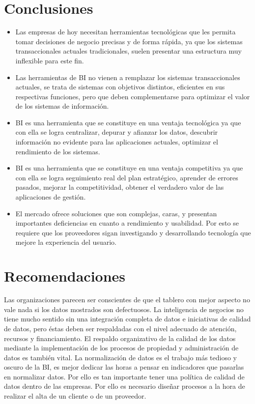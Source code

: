 \documentclass[twoside,twocolumn]{article}
\begin{document}
\section{Conclusiones}
\begin{itemize}	
	\item Las empresas de hoy necesitan herramientas tecnológicas que les permita tomar decisiones de negocio precisas y de forma rápida, ya que los sistemas transaccionales actuales tradicionales, suelen presentar una estructura muy inflexible para este fin.
	\item Las herramientas de BI no vienen a remplazar los sistemas transaccionales actuales, se trata de sistemas con objetivos distintos, eficientes en sus respectivas funciones, pero que deben complementarse para optimizar el valor de los sistemas de información.
	\item BI es una herramienta que se constituye en una ventaja tecnológica ya que con ella se logra centralizar, depurar y afianzar los datos, descubrir información no evidente para las aplicaciones actuales, optimizar el rendimiento de los sistemas.
	\item BI es una herramienta que se constituye en una ventaja competitiva ya que con ella se logra seguimiento real del plan estratégico, aprender de errores pasados, mejorar la competitividad, obtener el verdadero valor de las aplicaciones de gestión.
	\item El mercado ofrece soluciones que son complejas, caras, y presentan importantes deficiencias en cuanto a rendimiento y usabilidad. Por esto se requiere que los proveedores sigan investigando y desarrollando tecnología que mejore la experiencia del usuario.
\end{itemize}


\section{Recomendaciones}
Las organizaciones parecen ser conscientes de que el tablero con mejor aspecto no vale nada si los datos mostrados son defectuosos. La inteligencia de negocios no tiene mucho sentido sin una integración completa de datos e iniciativas de calidad de datos, pero éstas deben ser respaldadas con el nivel adecuado de atención, recursos y financiamiento. El respaldo organizativo de la calidad de los datos mediante la implementación de los procesos de propiedad y administración de datos es también vital. La normalización de datos es el trabajo más tedioso y oscuro de la BI, es mejor dedicar las horas a pensar en indicadores que pasarlas en normalizar datos. Por ello es tan importante tener una política de calidad de datos dentro de las empresas. Por ello es necesario diseñar procesos a la hora de realizar el alta de un cliente o de un proveedor.
\end{document}

